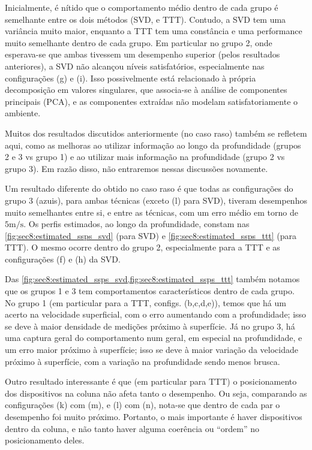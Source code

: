 \const Inicialmente, é nítido que o comportamento médio dentro de cada grupo é semelhante entre os dois métodos (SVD, e TTT). Contudo, a SVD tem uma variância muito maior, enquanto a TTT tem uma constância e uma performance muito semelhante dentro de cada grupo. Em particular no grupo 2, onde esperava-se que ambas tivessem um desempenho superior (pelos resultados anteriores), a SVD não alcançou níveis satisfatórios, especialmente nas configurações (g) e (i). Isso possivelmente está relacionado à própria decomposição em valores singulares, que associa-se à análise de componentes principais (PCA), e as componentes extraídas não modelam satisfatoriamente o ambiente.

\const Muitos dos resultados discutidos anteriormente (no caso raso) também se refletem aqui, como as melhoras ao utilizar informação ao longo da profundidade (grupos 2 e 3 vs grupo 1) e ao utilizar mais informação na profundidade (grupo 2 vs grupo 3). Em razão disso, não entraremos nessas discussões novamente.



\const Um resultado diferente do obtido no caso raso é que todas as configurações do grupo 3 (azuis), para ambas técnicas (exceto (l) para SVD), tiveram desempenhos muito semelhantes entre si, e entre as técnicas, com um erro médio em torno de $5\si{\meter/\second}$. Os perfis estimados, ao longo da profundidade, constam nas \cref{fig:sec8:estimated_ssps_svd} (para SVD) e \cref{fig:sec8:estimated_ssps_ttt} (para TTT). O mesmo ocorre dentro do grupo 2, especialmente para a TTT e as configurações (f) e (h) da SVD.



\const Das \cref{fig:sec8:estimated_ssps_svd,fig:sec8:estimated_ssps_ttt} também notamos que os grupos 1 e 3 tem comportamentos característicos dentro de cada grupo. No grupo 1 (em particular para a TTT, configs. (b,c,d,e)), temos que há um acerto na velocidade superficial, com o erro aumentando com a profundidade; isso se deve à maior densidade de medições próximo à superfície. Já no grupo 3, há uma captura geral do comportamento num geral, em especial na profundidade, e um erro maior próximo à superfície; isso se deve à maior variação da velocidade próximo à superfície, com a variação na profundidade sendo menos brusca.

\const Outro resultado interessante é que (em particular para TTT) o posicionamento dos dispositivos na coluna não afeta tanto o desempenho. Ou seja, comparando as configurações (k) com (m), e (l) com (n), nota-se que dentro de cada par o desempenho foi muito próximo. Portanto, o mais importante é haver dispositivos dentro da coluna, e não tanto haver alguma coerência ou ``ordem'' no posicionamento deles.


